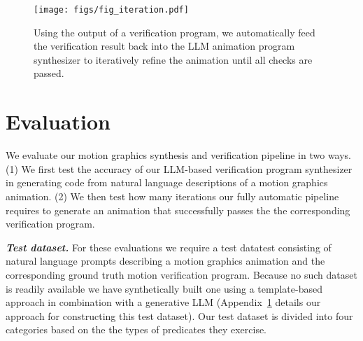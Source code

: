 
\begin{figure*}[t]
    \centering
    \texttt{[image: figs/fig\_iteration.pdf]}
    \caption{Using the output of a \dslname{} verification program, we automatically feed the verification result back into the LLM animation program synthesizer to iteratively refine the animation until all checks are passed. }
    \label{fig:iteration}
\end{figure*}


\section{Evaluation}

We evaluate our motion graphics synthesis and verification pipeline in
two ways.  (1) We first test the accuracy of our LLM-based
verification program synthesizer in generating \dslname{} code from
natural language descriptions of a motion graphics animation.  (2) We
then test how many iterations our fully automatic pipeline requires to
generate an animation that successfully passes the the corresponding
verification program.

\vspace{0.5em}
\noindent
{\bf \em Test dataset.}
For these evaluations we require a test datatest consisting of natural
language prompts describing a motion graphics animation and the
corresponding ground truth motion verification program. 
%
Because no such dataset is readily available we have synthetically
built one using a template-based approach in combination with a
generative LLM (Appendix~\ref{} details our approach for constructing
this test dataset).
Our test dataset is divided into four categories
based on the the types of \dslname{}
predicates they exercise.

